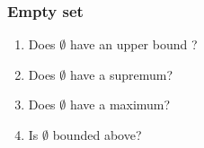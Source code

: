 \documentclass[14pt]{beamer}
\begin{document}
	\begin{frame}[t]
		\frametitle{Empty set}

		\begin{enumerate}
			\item Does $\emptyset$ have an upper bound ?

			\item Does $\emptyset$ have a supremum?

			\item Does $\emptyset$ have a maximum?

			\item Is $\emptyset$ bounded above?
		\end{enumerate}
	\end{frame}

\end{document}
